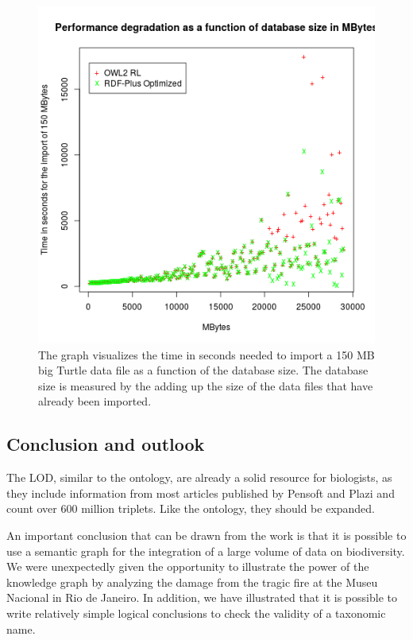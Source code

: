 \begin{figure}
\centering
\includegraphics[width=\textwidth]{Figures/performance-degradation-both}
\decoRule
\caption[Performance degradation]{The graph visualizes the time in seconds needed to import a 150 MB big Turtle data file as a function of the database size. The database size is measured by the adding up the size of the data files that have already been imported.}
\label{fig:performance-degradation}
\end{figure}

\subsection{Conclusion and outlook}

The LOD, similar to the ontology, are already a solid resource for biologists, as they include information from most articles published by Pensoft and Plazi and count over 600 million triplets. Like the ontology, they should be expanded.

An important conclusion that can be drawn from the work is that it is possible to use a semantic graph for the integration of a large volume of data on biodiversity. We were unexpectedly given the opportunity to illustrate the power of the knowledge graph by analyzing the damage from the tragic fire at the Museu Nacional in Rio de Janeiro. In addition, we have illustrated that it is possible to write relatively simple logical conclusions to check the validity of a taxonomic name.

